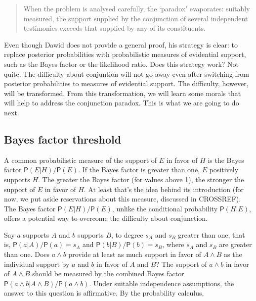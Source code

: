 \documentclass[10pt,dvipsnames,enabledeprecatedfontcommands]{scrartcl}
\newcommand{\et}{\wedge}
\newcommand{\pr}[1]{\mathsf{P}(#1)}
\begin{document}
\begin{quote} When the problem is analysed carefully, the `paradox' evaporates: suitably measured, 
 the support supplied by the conjunction of several independent 
 testimonies exceeds that supplied by any of its constituents.
 \end{quote}

\noindent
 Even though Dawid does not provide a general
proof, his strategy is
clear: to replace posterior probabilities with probabilistic measures of
evidential support, such as the Bayes factor or the likelihood ratio.
Does this strategy work? Not quite. The difficulty about conjuntion will
not go away even after switching from posterior probabilities to
measures of evidential support. The difficulty, however, will be
transformed. From this transformation, we will learn some morals that
will help to address the conjunction paradox. This is what we are going
to do next.

\subsection{Bayes factor threshold}\label{bayes-factor-threshold}

A common probabilistic measure of the support of \(E\) in favor of \(H\)
is the Bayes factor \(\pr{E | H}/\pr{E}\). If the Bayes factor is
greater than one, \(E\) positively supports \(H\). The greater the Bayes
factor (for values above 1), the stronger the support of \(E\) in favor
of \(H\). At least that's the idea behind its introduction (for now, we
put aside reservations about this measure, discussed in CROSSREF). The
Bayes factor \(\pr{E | H}/\pr{E}\), unlike the conditional probability
\(\pr{H | E}\), offers a potential way to overcome the difficulty about
conjunction.

Say \(a\) supports \(A\) and \(b\) supports \(B\), to degree \(s_A\) and
\(s_B\) greater than one, that is, \(\pr{a | A}/\pr{a}=s_A\) and
\(\pr{b | B}/\pr{b}=s_B\), where \(s_A\) and \(s_B\) are greater than
one. Does \(a \wedge b\) provide at least as much support in favor of
\(A \wedge B\) as the individual support by \(a\) and \(b\) in favor of
\(A\) and \(B\)? The support of \(a\et b\) in favor of \(A\et B\) should
be measured by the combined Bayes factor
\(\pr{a \wedge b| A\wedge B}/\pr{a \wedge b}\). Under suitable
independence assumptions, the answer to this question is affirmative. By
the probability calculus,
\end{document}
